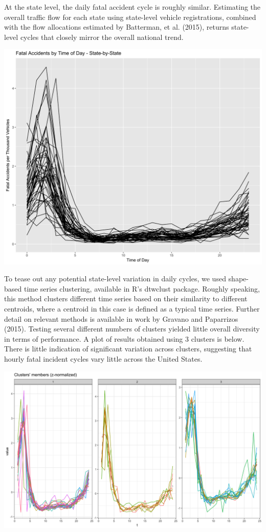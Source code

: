 \documentclass[11pt, oneside]{article}   	%
\begin{document}
At the state level, the daily fatal accident cycle is roughly similar. Estimating the overall traffic flow for each state using state-level vehicle registrations, combined with the flow allocations estimated by Batterman, et al. (2015), returns state-level cycles that closely mirror the overall national trend.

\begin{center}
\includegraphics[width=.75\textwidth]{WeightedStatePlot.png}
\end{center}

To tease out any potential state-level variation in daily cycles, we used shape-based time series clustering, available in R's dtwclust package. Roughly speaking, this method clusters different time series based on their similarity to different centroids, where a centroid in this case is defined as a typical time series. Further detail on relevant methods is available in work by Gravano and Paparrizos (2015). Testing several different numbers of clusters yielded little overall diversity in terms of performance. A plot of results obtained using 3 clusters is below. There is little indication of significant variation across clusters, suggesting that hourly fatal incident cycles vary little across the United States.

\begin{center}
\includegraphics[width=.75\textwidth]{StateClusterPlot_Hourly.png}
\end{center}
\end{document}
